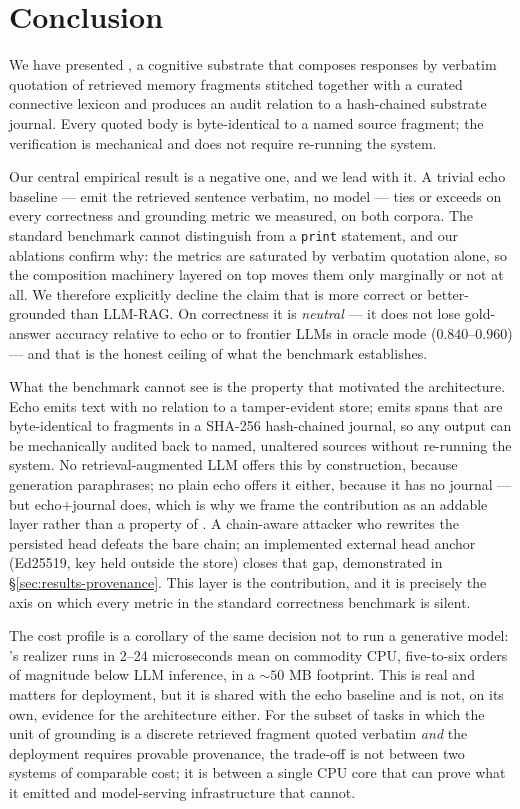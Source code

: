 \section{Conclusion}
\label{sec:conclusion}

We have presented \hyphae{}, a cognitive substrate that
composes responses by verbatim quotation of retrieved memory
fragments stitched together with a curated connective lexicon
and produces an audit relation to a hash-chained substrate
journal. Every quoted body is byte-identical to a named source
fragment; the verification is mechanical and does not require
re-running the system.

Our central empirical result is a negative one, and we lead with
it. A trivial echo baseline --- emit the retrieved sentence
verbatim, no model --- ties or exceeds \hyphae{} on every
correctness and grounding metric we measured, on both corpora.
The standard benchmark cannot distinguish \hyphae{} from a
\texttt{print} statement, and our ablations confirm why: the
metrics are saturated by verbatim quotation alone, so the
composition machinery layered on top moves them only marginally
or not at all. We therefore explicitly decline the claim that
\hyphae{} is more correct or better-grounded than LLM-RAG. On
correctness it is \emph{neutral} --- it does not lose gold-answer
accuracy relative to echo or to frontier LLMs in oracle mode
($0.840$--$0.960$) --- and that is the honest ceiling of what the
benchmark establishes.

What the benchmark cannot see is the property that motivated the
architecture. Echo emits text with no relation to a tamper-evident
store; \hyphae{} emits spans that are byte-identical to fragments
in a SHA-256 hash-chained journal, so any output can be
mechanically audited back to named, unaltered sources without
re-running the system. No retrieval-augmented LLM offers this by
construction, because generation paraphrases; no plain echo offers
it either, because it has no journal --- but echo$+$journal does,
which is why we frame the contribution as an addable layer rather
than a property of \hyphae{}. A chain-aware attacker who rewrites
the persisted head defeats the bare chain; an implemented external
head anchor (Ed25519, key held outside the store) closes that gap,
demonstrated in §\ref{sec:results-provenance}. This layer is the
contribution, and it is precisely the axis on which every metric
in the standard correctness benchmark is silent.

The cost profile is a corollary of the same decision not to run a
generative model: \hyphae{}'s realizer runs in 2--24 microseconds
mean on commodity CPU, five-to-six orders of magnitude below LLM
inference, in a $\sim 50$ MB footprint. This is real and matters
for deployment, but it is shared with the echo baseline and is
not, on its own, evidence for the architecture either. For the
subset of tasks in which the unit of grounding is a discrete
retrieved fragment quoted verbatim \emph{and} the deployment
requires provable provenance, the trade-off is not between two
systems of comparable cost; it is between a single CPU core that
can prove what it emitted and model-serving infrastructure that
cannot.


